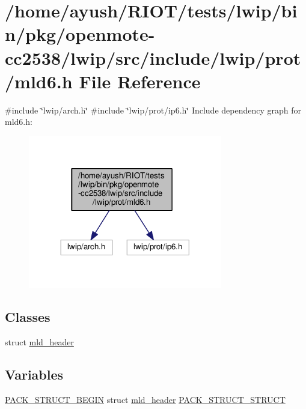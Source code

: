 \hypertarget{openmote-cc2538_2lwip_2src_2include_2lwip_2prot_2mld6_8h}{}\section{/home/ayush/\+R\+I\+O\+T/tests/lwip/bin/pkg/openmote-\/cc2538/lwip/src/include/lwip/prot/mld6.h File Reference}
\label{openmote-cc2538_2lwip_2src_2include_2lwip_2prot_2mld6_8h}
{\ttfamily \#include \char`\"{}lwip/arch.\+h\char`\"{}}\newline
{\ttfamily \#include \char`\"{}lwip/prot/ip6.\+h\char`\"{}}\newline
Include dependency graph for mld6.\+h\+:
\nopagebreak
\begin{figure}[H]
\begin{center}
\leavevmode
\includegraphics[width=240pt]{openmote-cc2538_2lwip_2src_2include_2lwip_2prot_2mld6_8h__incl}
\end{center}
\end{figure}
\subsection*{Classes}
\begin{DoxyCompactItemize}
\item 
struct \hyperlink{structmld__header}{mld\+\_\+header}
\end{DoxyCompactItemize}
\subsection*{Variables}
\begin{DoxyCompactItemize}
\item 
\hyperlink{group__compiler__abstraction_ga73199061891adf1b912d20835c7d5e96}{P\+A\+C\+K\+\_\+\+S\+T\+R\+U\+C\+T\+\_\+\+B\+E\+G\+IN} struct \hyperlink{structmld__header}{mld\+\_\+header} \hyperlink{openmote-cc2538_2lwip_2src_2include_2lwip_2prot_2mld6_8h_aecc75d945d3a6490b6fd37f6d14c7eca}{P\+A\+C\+K\+\_\+\+S\+T\+R\+U\+C\+T\+\_\+\+S\+T\+R\+U\+CT}
\end{DoxyCompactItemize}


